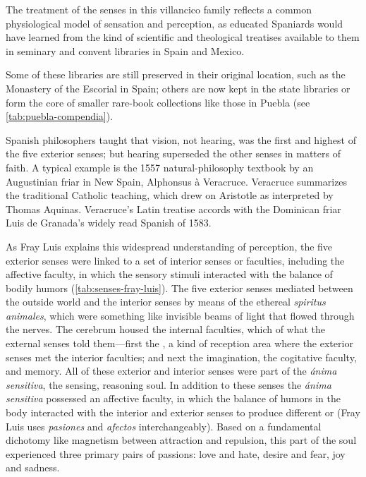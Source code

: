 The treatment of the senses in this villancico family reflects a common
physiological model of sensation and perception, as educated Spaniards would
have learned from the kind of scientific and theological treatises available to
them in seminary and convent libraries in Spain and Mexico.%
\begin{Footnote}
    Some of these libraries are still preserved in their original location, such
    as the Monastery of the Escorial in Spain; others are now kept in the state
    libraries or form the core of smaller rare-book collections like those in
    Puebla (see \cref{tab:puebla-compendia}).
\end{Footnote}
Spanish philosophers taught that vision, not hearing, was the first and highest
of the five exterior senses; but hearing superseded the other senses in matters
of faith.
A typical example is the 1557 natural-philosophy textbook  by an Augustinian friar in New Spain, Alphonsus à Veracruce.%
    \Autocite{Veracruce:Phisica}
Veracruce summarizes the traditional Catholic teaching, which drew on Aristotle
as interpreted by Thomas Aquinas.
Veracruce's Latin treatise accords with the Dominican friar Luis de Granada's
widely read Spanish  of 1583.%
    \Autocites{LuisdeGranada:Simbolo}{LuisdeGranada-Balcells:SimboloPtI}

As Fray Luis explains this widespread understanding of perception, the five
exterior senses were linked to a set of interior senses or faculties, including
the affective faculty, in which the sensory stimuli interacted with the balance
of bodily humors (\cref{tab:senses-fray-luis}).%
    \Autocite[ch.~27--35, pp.~439--494]{LuisdeGranada-Balcells:SimboloPtI}
The five exterior senses mediated between the outside world and the interior
senses by means of the ethereal \emph{spiritus animales}, which were something
like invisible beams of light that flowed through the nerves.  
The cerebrum housed the internal faculties, which  of what
the external senses told them---first the , a kind of
reception area where the exterior senses met the interior faculties; and next
the imagination, the cogitative faculty, and memory.
All of these exterior and interior senses were part of the \emph{ánima
sensitiva}, the sensing, reasoning soul.
In addition to these senses the \emph{ánima sensitiva} possessed an affective
faculty, in which the balance of humors in the body interacted with the interior
and exterior senses to produce different  or 
(Fray Luis uses \emph{pasiones} and \emph{afectos} interchangeably).
Based on a fundamental dichotomy like magnetism between attraction and
repulsion, this  part of the soul experienced three
primary pairs of passions: love and hate, desire and fear, joy and sadness.

